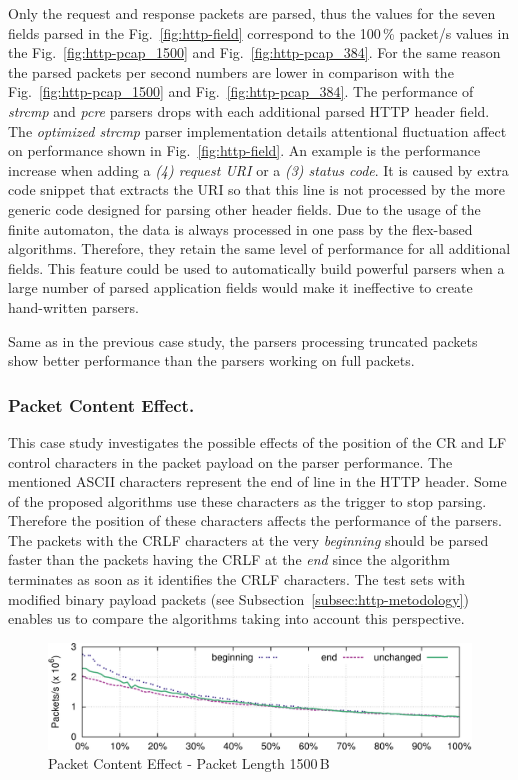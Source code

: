 Only the request and response packets are parsed, thus the values for the seven fields parsed in the Fig.~\ref{fig:http-field} correspond to the 100\,\% packet/s values in the Fig.~\ref{fig:http-pcap_1500} and Fig.~\ref{fig:http-pcap_384}. For the same reason the parsed packets per second numbers are lower in comparison with the Fig.~\ref{fig:http-pcap_1500} and Fig.~\ref{fig:http-pcap_384}. The performance of \emph{strcmp} and \emph{pcre} parsers drops with each additional parsed HTTP header field. The \emph{optimized strcmp} parser implementation details attentional fluctuation affect on performance shown in Fig.~\ref{fig:http-field}. An example is the performance increase when adding a \emph{(4) request URI} or a \emph{(3) status code}. It is caused by extra code snippet that extracts the URI so that this line is not processed by the more generic code designed for parsing other header fields. Due to the usage of the finite automaton, the data is always processed in one pass by the flex-based algorithms. Therefore, they retain the same level of performance for all additional fields. This feature could be used to automatically build powerful parsers when a large number of parsed application fields would make it ineffective to create hand-written parsers.

Same as in the previous case study, the parsers processing truncated packets show better performance than the parsers working on full packets.

\subsubsection*{Packet Content Effect.}

This case study investigates the possible effects of the position of the CR and LF control characters in the packet payload on the parser performance. The mentioned ASCII characters represent the end of line in the HTTP header. Some of the proposed algorithms use these characters as the trigger to stop parsing. Therefore the position of these characters affects the performance of the parsers. The packets with the CRLF characters at the very \emph{beginning} should be parsed faster than the packets having the CRLF at the \emph{end} since the algorithm terminates as soon as it identifies the CRLF characters. The test sets with modified binary payload packets (see Subsection~\ref{subsec:http-metodology}) enables us to compare the algorithms taking into account this perspective.

\begin{figure}
    \includegraphics[width=\textwidth]{figures/paper-http/1500_noflex}
    \caption{Packet Content Effect - Packet Length 1500\,B}
    \label{fig:http-packet_structure}
\end{figure}

